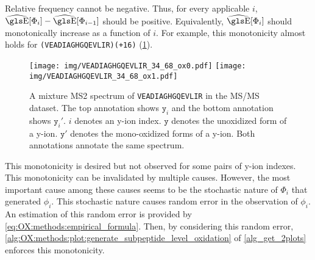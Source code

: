 Relative frequency cannot be negative.
Thus, for every applicable \(i\), \({\singlehat\E}[\Phi_i] - {\singlehat\E}[\Phi_{i-1}]\) should be positive.
Equivalently, \(\displaystyle {\singlehat\E}[\Phi_i]\) should monotonically increase as a function of \(i\).
For example, this monotonicity almost holds for \texttt{(VEADIAGHGQEVLIR)(+16)} (\cref{fig:OX:dataset:oxid_vs_unox_for_VEADIAGHGQEVLIR}).
\begin{figure}
\texttt{[image: img/VEADIAGHGQEVLIR\_34\_68\_ox0.pdf]}
\texttt{[image: img/VEADIAGHGQEVLIR\_34\_68\_ox1.pdf]}
\caption[
	A mixture \gls{MS2} spectrum of \texttt{VEADIAGHGQEVLIR} in the \gls{MS/MS} dataset.]{
	A mixture \gls{MS2} spectrum of \texttt{VEADIAGHGQEVLIR} in the \gls{MS/MS} dataset.
	The top annotation shows \(\texttt{y}_i\) and the bottom annotation shows \(\texttt{y}_i'\).
	\(i\) denotes an y-ion index. 
	\(\texttt{y}\) denotes the unoxidized form of a y-ion. 
	\(\texttt{y}'\) denotes the \gls{mono-oxidized} forms of a y-ion.
	Both annotations annotate the same spectrum.
	\label{fig:OX:dataset:oxid_vs_unox_for_VEADIAGHGQEVLIR}
}
\end{figure}	
This monotonicity is desired but not observed for some pairs of y-ion indexes.
This monotonicity can be invalidated by multiple causes.
However, the most important cause among these causes seems to be the stochastic nature of \(\Phi_i\) that generated \(\phi_i\).
This stochastic nature causes random error in the observation of \(\phi_i\).
An estimation of this random error is provided by \cref{eq:OX:methods:empirical_formula}.
Then, by considering this random error, \cref{alg:OX:methods:plot:generate_subpeptide_level_oxidation} of \cref{alg_get_2plots} enforces this monotonicity.		

